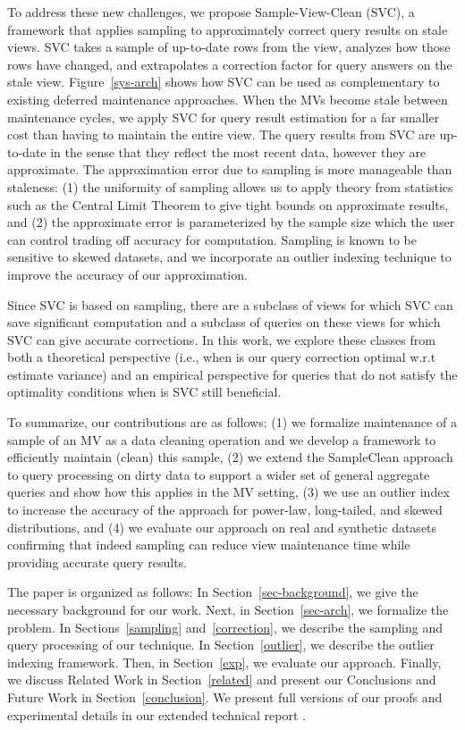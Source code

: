 To address these new challenges, we propose Sample-View-Clean (SVC), a framework that applies sampling to approximately correct query results on stale views.
SVC takes a sample of up-to-date rows from the view, analyzes how those rows have changed, and extrapolates a correction factor for query answers on the stale view. Figure~\ref{sys-arch} shows how SVC can be used as complementary to existing deferred maintenance approaches. When the MVs become stale between maintenance cycles, we apply SVC for query result estimation for a far smaller cost than having to maintain the entire view.
The query results from SVC are up-to-date in the sense that they reflect the most recent data, however they are approximate. 
The approximation error due to sampling is more manageable than staleness: (1) the uniformity of sampling allows us to apply theory from statistics such as the Central Limit Theorem to give tight bounds on approximate results, and (2) the approximate error is parameterized by the sample size which the user can control trading off accuracy for computation.
Sampling is known to be sensitive to skewed datasets, and we incorporate an outlier indexing technique to improve the accuracy of our approximation.

Since SVC is based on sampling, there are a subclass of views for which SVC can save significant computation and a subclass of queries on these views for which SVC can give accurate corrections.
In this work, we explore these classes from both a theoretical perspective (i.e., when is our query correction optimal w.r.t estimate variance) and an empirical perspective for queries that do not satisfy the optimality conditions when is SVC still beneficial.

To summarize, our contributions are as follows: (1) we formalize maintenance of a sample of an MV as a data cleaning operation and we develop a framework to efficiently maintain (clean) this sample, (2) we extend the SampleClean approach to query processing on dirty data to support a wider set of general aggregate queries and show how this applies in the MV setting, (3) we use an outlier index to increase the accuracy of the approach for power-law, long-tailed, and skewed distributions, and (4) we evaluate our approach on real and synthetic datasets confirming that indeed sampling can reduce view maintenance time while providing accurate query results. 

The paper is organized as follows: 
In Section~\ref{sec-background}, we give the necessary background for our work.
Next, in Section~\ref{sec-arch}, we formalize the problem.
In Sections~\ref{sampling} and~\ref{correction}, we describe the sampling and query processing of our technique.
In Section~\ref{outlier}, we describe the outlier indexing framework.
Then, in Section~\ref{exp}, we evaluate our approach.
Finally, we discuss Related Work in Section~\ref{related} and present our Conclusions and Future Work in Section~\ref{conclusion}.
We present full versions of our proofs and experimental details in our extended technical report \cite{technicalReport}.
